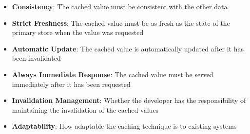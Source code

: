 \begin{itemize}
  \item \textbf{Consistency}: The cached value must be consistent with the other data
  \item \textbf{Strict Freshness}: The cached value must be as fresh as the state of the primary store when the value was requested
  \item \textbf{Automatic Update}: The cached value is automatically updated after it has been invalidated
  \item \textbf{Always Immediate Response}: The cached value must be served immediately after it has been requested
  \item \textbf{Invalidation Management}: Whether the developer has the responsibility of maintaining the invalidation of the cached values
  \item \textbf{Adaptability}: How adaptable the caching technique is to existing systems
\end{itemize}


